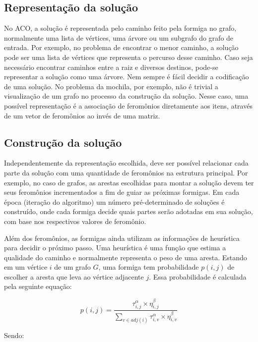 \FloatBarrier
\subsection{Representação da solução}
No ACO, a solução é representada pelo caminho feito pela formiga no grafo, normalmente uma lista de vértices, uma árvore ou um subgrafo do grafo de entrada. Por exemplo, no problema de encontrar o menor caminho, a solução pode ser uma lista de vértices que representa o percurso desse caminho. Caso seja necessário encontrar caminhos entre a raiz e diversos destinos, pode-se representar a solução como uma árvore. Nem sempre é fácil decidir a codificação de uma solução. No problema da mochila, por exemplo, não é trivial a visualização de um grafo no processo da construção da solução. Nesse caso, uma possível representação é a associação de feromônios diretamente aos itens, através de um vetor de feromônios ao invés de uma matriz.

\subsection{Construção da solução} \label{section_construcao_solucao}
\label{section_otimizacao_aco_construcao}
Independentemente da representação escolhida, deve ser possível relacionar cada parte da solução com uma quantidade de feromônios na estrutura principal. Por exemplo, no caso de grafos, as arestas escolhidas para montar a solução devem ter seus feromônios incrementados a fim de guiar as próximas formigas. Em cada época (iteração do algoritmo) um número pré-determinado de soluções é construído, onde cada formiga decide quais partes serão adotadas em sua solução, com base nos respectivos valores de feromônio.

Além dos feromônios, as formigas ainda utilizam as informações de heurística para decidir o próximo passo. Uma heurística é uma função que estima a qualidade do caminho e normalmente representa o peso de uma aresta. Estando em um vértice $i$ de um grafo $G$, uma formiga tem probabilidade $p(i,j)$ de escolher a aresta que leva ao vértice adjacente $j$. Essa probabilidade é calculada pela seguinte equação:

\begin{equation}p(i,j) = \frac{\tau_{i,j}^\alpha \times \eta_{i,j}^\beta}{\sum_{v \in adj(i)} \tau_{i,v}^\alpha \times \eta_{i,v}^\beta}\end{equation}

Sendo:

